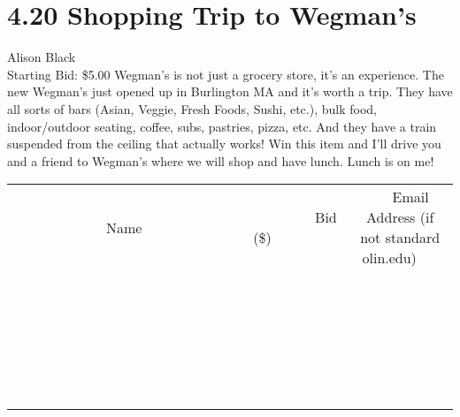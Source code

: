 \documentclass[11pt]{article}
\begin{document}
\section*{4.20 Shopping Trip to Wegman's}
Alison Black
\\
Starting Bid: \$5.00
\newline
Wegman's is not just a grocery store, it's an experience.  The new Wegman's just opened up in Burlington MA and it's worth a trip.  They have all sorts of bars (Asian, Veggie, Fresh Foods, Sushi, etc.), bulk food, indoor/outdoor seating, coffee, subs, pastries, pizza, etc.  And they have a train suspended from the ceiling that actually works!  Win this item and I'll drive you and a friend to Wegman's where we will shop and have lunch.  Lunch is on me!
\\[6ex]
\begin{tabular}{c c c}
~~~~~~~~~~~~~Name~~~~~~~~~~~~~ & ~~~~~~~~~Bid (\$)~~~~~~~~~  & ~~~Email Address (if not standard olin.edu)~~~\\
 & & \\
\hline
 & & \\
\hline
 & & \\
\hline
 & & \\
\hline
 & & \\
\hline
 & & \\
\hline
 & & \\
\hline
 & & \\
\hline
 & & \\
\hline
 & & \\
\hline
 & & \\
\hline
 & & \\
\hline
 & & \\
\hline
 & & \\
\hline
 & & \\
\hline
 & & \\
\hline
 & & \\
\hline
 & & \\
\hline
 & & \\
\hline
 & & \\
\hline
 & & \\
\hline
 & & \\
\hline
 & & \\
\hline
 & & \\
\hline
 & & \\
\hline
 & & \\
\hline
\end{tabular}
\newpage
\end{document}
